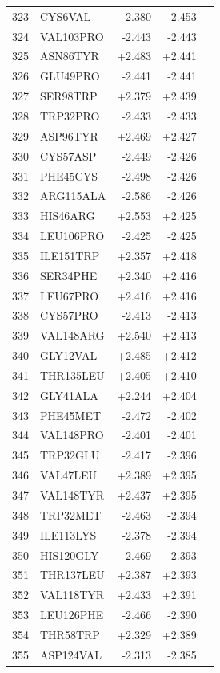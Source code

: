 \begin{longtable}{r l r r c}
323 & CYS6VAL & -2.380 & -2.453 &  \\
324 & VAL103PRO & -2.443 & -2.443 &  \\
325 & ASN86TYR & +2.483 & +2.441 &  \\
326 & GLU49PRO & -2.441 & -2.441 &  \\
327 & SER98TRP & +2.379 & +2.439 &  \\
328 & TRP32PRO & -2.433 & -2.433 &  \\
329 & ASP96TYR & +2.469 & +2.427 &  \\
330 & CYS57ASP & -2.449 & -2.426 &  \\
331 & PHE45CYS & -2.498 & -2.426 &  \\
332 & ARG115ALA & -2.586 & -2.426 &  \\
333 & HIS46ARG & +2.553 & +2.425 &  \\
334 & LEU106PRO & -2.425 & -2.425 &  \\
335 & ILE151TRP & +2.357 & +2.418 &  \\
336 & SER34PHE & +2.340 & +2.416 &  \\
337 & LEU67PRO & +2.416 & +2.416 &  \\
338 & CYS57PRO & -2.413 & -2.413 &  \\
339 & VAL148ARG & +2.540 & +2.413 &  \\
340 & GLY12VAL & +2.485 & +2.412 &  \\
341 & THR135LEU & +2.405 & +2.410 &  \\
342 & GLY41ALA & +2.244 & +2.404 &  \\
343 & PHE45MET & -2.472 & -2.402 &  \\
344 & VAL148PRO & -2.401 & -2.401 &  \\
345 & TRP32GLU & -2.417 & -2.396 &  \\
346 & VAL47LEU & +2.389 & +2.395 &  \\
347 & VAL148TYR & +2.437 & +2.395 &  \\
348 & TRP32MET & -2.463 & -2.394 &  \\
349 & ILE113LYS & -2.378 & -2.394 &  \\
350 & HIS120GLY & -2.469 & -2.393 &  \\
351 & THR137LEU & +2.387 & +2.393 &  \\
352 & VAL118TYR & +2.433 & +2.391 &  \\
353 & LEU126PHE & -2.466 & -2.390 &  \\
354 & THR58TRP & +2.329 & +2.389 &  \\
355 & ASP124VAL & -2.313 & -2.385 &  \\

\end{longtable}
